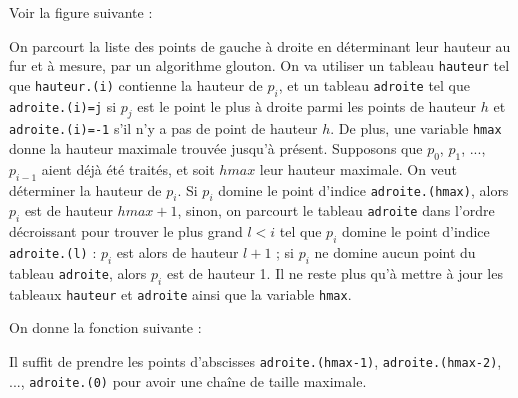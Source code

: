 Voir la figure suivante :


\Q
On parcourt la liste des points de gauche à droite en déterminant leur hauteur au fur et à mesure, par un algorithme glouton. On va utiliser un tableau \texttt{hauteur} tel que \texttt{hauteur.(i)} contienne la hauteur de $p_i$, et un tableau \texttt{adroite} tel que \texttt{adroite.(i)=j} si $p_j$ est le point le plus à droite parmi les points de hauteur $h$ et \texttt{adroite.(i)=-1} s'il n'y a pas de point de hauteur $h$. De plus, une variable \texttt{hmax} donne la hauteur maximale trouvée jusqu'à présent. Supposons que $p_0$, $p_1$, ..., $p_{i-1}$ aient déjà été traités, et soit $hmax$ leur hauteur maximale. On veut déterminer la hauteur de $p_i$. Si $p_i$ domine le point d'indice \texttt{adroite.(hmax)}, alors $p_i$ est de hauteur $hmax+1$, sinon, on parcourt le tableau \texttt{adroite} dans l'ordre décroissant pour trouver le plus grand $l<i$ tel que $p_i$ domine le point d'indice \texttt{adroite.(l)} : $p_i$ est alors de hauteur $l+1$ ; si $p_i$ ne domine aucun point du tableau \texttt{adroite}, alors $p_i$ est de hauteur 1. Il ne reste plus qu'à mettre à jour les tableaux \texttt{hauteur} et \texttt{adroite} ainsi que la variable \texttt{hmax}.

\Q
On donne la fonction suivante :



\Q
Il suffit de prendre les points d'abscisses \texttt{adroite.(hmax-1)}, \texttt{adroite.(hmax-2)}, ..., \texttt{adroite.(0)} pour avoir une chaîne de taille maximale.
\bigskip

\Fin
